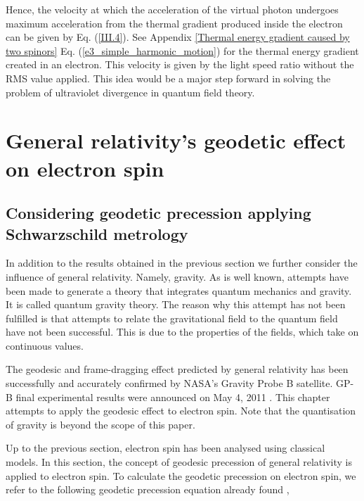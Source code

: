 \documentclass[%
 reprint,
 amsmath,amssymb,
 aps,
]{revtex4-1}
\numberwithin{equation}{section}%
\begin{document}
Hence, the velocity at which the acceleration of the virtual photon undergoes maximum acceleration from the thermal gradient produced inside the electron can be given by Eq. (\ref{III.4}). See Appendix \ref{Thermal energy gradient caused by two spinors} Eq. (\ref{e3_simple_harmonic_motion}) for the thermal energy gradient created in an electron. This velocity is given by the light speed ratio without the RMS value applied. This idea would be a major step forward in solving the problem of ultraviolet divergence in quantum field theory.


\section{General relativity's geodetic effect on electron spin}
\subsection{Considering geodetic precession applying Schwarzschild metrology}


In addition to the results obtained in the previous section we further consider the influence of general relativity. Namely, gravity. As is well known, attempts have been made to generate a theory that integrates quantum mechanics and gravity. It is called quantum gravity theory. The reason why this attempt has not been fulfilled is that attempts to relate the gravitational field to the quantum field have not been successful. This is due to the properties of the fields, which take on continuous values.

The geodesic and frame-dragging effect predicted by general relativity has been successfully and accurately confirmed by NASA's Gravity Probe B satellite. GP-B final experimental results were announced on May 4, 2011 \cite{NASA}. This chapter attempts to apply the geodesic effect to electron spin. Note that the quantisation of gravity is beyond the scope of this paper.

Up to the previous section, electron spin has been analysed using classical models. In this section, the concept of geodesic precession of general relativity is applied to electron spin. To calculate the geodetic precession on electron spin, we refer to the following geodetic precession equation already found \cite{Hartle},
\end{document}
